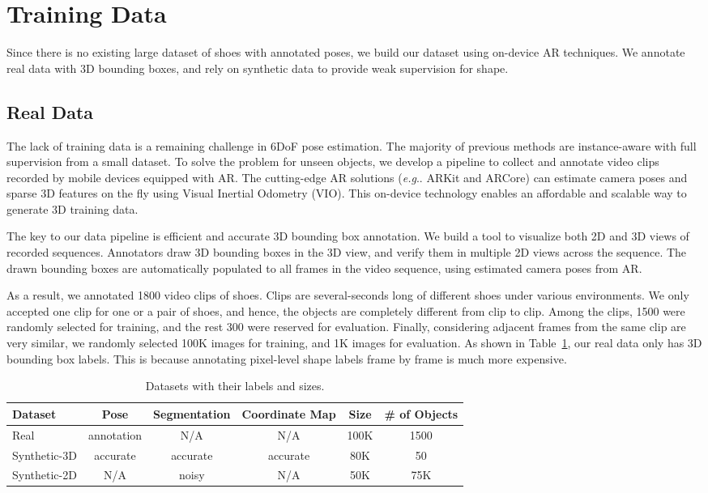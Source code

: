 \documentclass[runningheads]{llncs}
\makeatletter
\DeclareRobustCommand\onedot{\futurelet\@let@token\@onedot}
\def\@onedot{\ifx\@let@token.\else.\null\fi\xspace}
\def\eg{\emph{e.g}\onedot} \def\Eg{\emph{E.g}\onedot}
\makeatother
\begin{document}
\section{Training Data}
Since there is no existing large dataset of shoes with annotated poses, we build our dataset using on-device AR techniques. We annotate real data with 3D bounding boxes, and rely on synthetic data to provide weak supervision for shape.

\subsection{Real Data}
The lack of training data is a remaining challenge in 6DoF pose estimation. The majority of previous methods are instance-aware with full supervision from a small dataset. To solve the problem for unseen objects, we develop a pipeline to collect and annotate video clips recorded by mobile devices equipped with AR. The cutting-edge AR solutions (\eg ARKit and ARCore) can estimate camera poses and sparse 3D features on the fly using Visual Inertial Odometry (VIO). This on-device technology enables an affordable and scalable way to generate 3D training data.

The key to our data pipeline is efficient and accurate 3D bounding box annotation. We build a tool to visualize both 2D and 3D views of recorded sequences. Annotators draw 3D bounding boxes in the 3D view, and verify them in multiple 2D views across the sequence. The drawn bounding boxes are automatically populated to all frames in the video sequence, using estimated camera poses from AR. 

As a result, we annotated 1800 video clips of shoes. Clips are several-seconds long of different shoes under various environments. We only accepted one clip for one or a pair of shoes, and hence, the objects are completely different from clip to clip. Among the clips, 1500 were randomly selected for training, and the rest 300 were reserved for evaluation. Finally, considering adjacent frames from the same clip are very similar, we randomly selected 100K images for training, and 1K images for evaluation. As shown in Table~\ref{tab:data}, our real data only has 3D bounding box labels. This is because annotating pixel-level shape labels frame by frame is much more expensive.

\begin{table}[t]
\begin{center}
\begin{tabular}{l|c|c|c|c|c}\hline
Dataset & Pose & Segmentation & Coordinate Map & Size & \# of Objects \\
\hline
Real & annotation & N/A & N/A & 100K & 1500 \\
\hline
Synthetic-3D & accurate & accurate & accurate & 80K & 50 \\
\hline
Synthetic-2D & N/A & noisy & N/A & 50K & 75K\\
\hline
\end{tabular}
\caption{Datasets with their labels and sizes.}
\label{tab:data}
\end{center}
\end{table}
\end{document}
